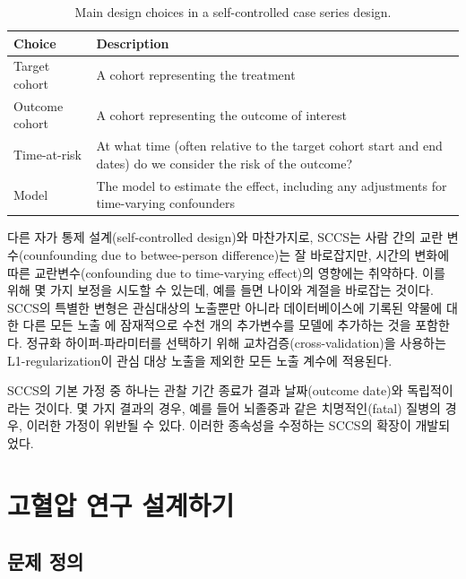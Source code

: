 \documentclass[11pt]{book}
\theoremstyle{definition}
\theoremstyle{definition}
\theoremstyle{definition}
\theoremstyle{remark}
\begin{document}
\begin{table}[t]

\caption{\label{tab:sccsChoices}Main design choices in a self-controlled case series design.}
\centering
\begin{tabu} to 
\toprule
Choice & Description\\
\midrule
Target cohort & A cohort representing the treatment\\
Outcome cohort & A cohort representing the outcome of interest\\
Time-at-risk & At what time (often relative to the target cohort start and end dates) do we consider the risk of the outcome?\\
Model & The model to estimate the effect, including any adjustments for time-varying confounders\\
\bottomrule
\end{tabu}
\end{table}

다른 자가 통제 설계(self-controlled design)와 마찬가지로, SCCS는 사람
간의 교란 변수(counfounding due to betwee-person difference)는 잘
바로잡지만, 시간의 변화에 따른 교란변수(confounding due to time-varying
effect)의 영향에는 취약하다. 이를 위해 몇 가지 보정을 시도할 수 있는데,
예를 들면 나이와 계절을 바로잡는 것이다. SCCS의 특별한 변형은 관심대상의
노출뿐만 아니라 데이터베이스에 기록된 약물에 대한 다른 모든 노출
\citep{simpson_2013} 에 잠재적으로 수천 개의 추가변수를 모델에 추가하는
것을 포함한다. 정규화 하이퍼-파라미터를 선택하기 위해
교차검증(cross-validation)을 사용하는 L1-regularization이 관심 대상
노출을 제외한 모든 노출 계수에 적용된다.

SCCS의 기본 가정 중 하나는 관찰 기간 종료가 결과 날짜(outcome date)와
독립적이라는 것이다. 몇 가지 결과의 경우, 예를 들어 뇌졸중과 같은
치명적인(fatal) 질병의 경우, 이러한 가정이 위반될 수 있다. 이러한
종속성을 수정하는 SCCS의 확장이 개발되었다. \citep{farrington_2011}

\section{고혈압 연구 설계하기}\label{--}

\subsection{문제 정의}\label{--1}
\end{document}
